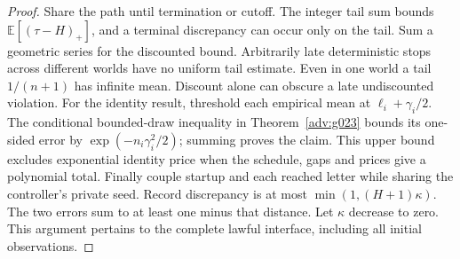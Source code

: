 \begin{proof}
Share the path until termination or cutoff. The integer tail sum bounds \(\mathbb E[(\tau-H)_+]\), and a terminal discrepancy can occur only on the tail. Sum a geometric series for the discounted bound. Arbitrarily late deterministic stops across different worlds have no uniform tail estimate. Even in one world a tail \(1/(n+1)\) has infinite mean. Discount alone can obscure a late undiscounted violation. For the identity result, threshold each empirical mean at \(\ell_i+\gamma_i/2\). The conditional bounded-draw inequality in Theorem~\ref{adv:g023} bounds its one-sided error by \(\exp(-n_i\gamma_i^2/2)\); summing proves the claim. This upper bound excludes exponential identity price when the schedule, gaps and prices give a polynomial total. Finally couple startup and each reached letter while sharing the controller's private seed. Record discrepancy is at most \(\min(1,(H+1)\kappa)\). The two errors sum to at least one minus that distance. Let \(\kappa\) decrease to zero. This argument pertains to the complete lawful interface, including all initial observations.
\end{proof}
